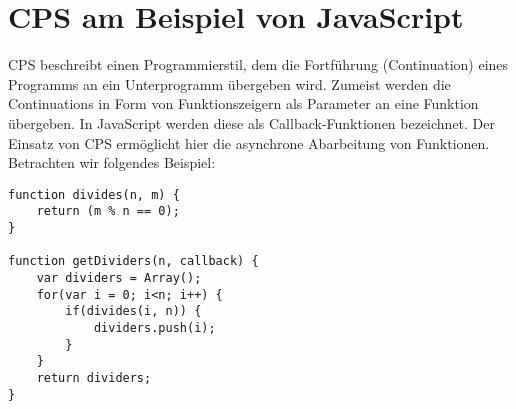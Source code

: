 \section{\acf{CPS} am Beispiel von JavaScript}
\acf{CPS} beschreibt einen Programmierstil, dem die Fortführung (Continuation) eines Programms an ein Unterprogramm übergeben wird. Zumeist werden die Continuations in Form von Funktionszeigern als Parameter an eine Funktion übergeben. In JavaScript werden diese als Callback-Funktionen bezeichnet. Der Einsatz von \acs{CPS} ermöglicht hier die asynchrone Abarbeitung von Funktionen. Betrachten wir folgendes Beispiel:\\
\begin{lstlisting}
function divides(n, m) {
	return (m % n == 0);
}

function getDividers(n, callback) {
	var dividers = Array();
	for(var i = 0; i<n; i++) {
		if(divides(i, n)) {
			dividers.push(i);
		}
	}
	return dividers;	
}
\end{lstlisting}
\acresetall
